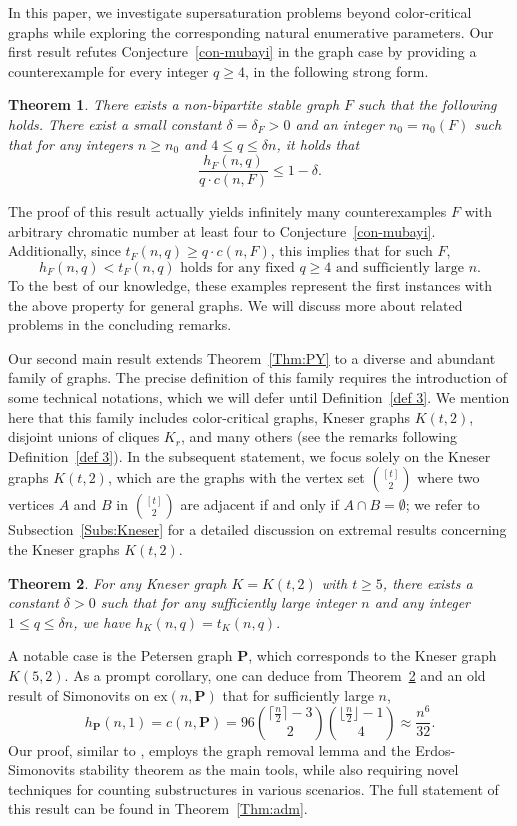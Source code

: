 \documentclass[10pt]{article}
\newtheorem{theorem}{Theorem}[section]
\def\ex{\mathrm{ex}}
\begin{document}
In this paper, we investigate supersaturation problems beyond color-critical graphs while exploring the corresponding natural enumerative parameters.
Our first result refutes Conjecture~\ref{con-mubayi} in the graph case by providing a counterexample for every integer $q\geq 4$, in the following strong form.

\begin{theorem}\label{main-example}
There exists a non-bipartite stable graph $F$ such that the following holds.
There exist a small constant $\delta=\delta_F>0$ and an integer $n_0=n_0(F)$ such that for any integers $n \geq n_0$ and $4 \leq q \leq \delta n$,
it holds that $$\frac{h_F(n,q)}{q \cdot c(n,F)}\leq 1-\delta.$$
\end{theorem}
\noindent The proof of this result actually yields infinitely many counterexamples $F$ with arbitrary chromatic number at least four to Conjecture~\ref{con-mubayi}. Additionally, since $t_F(n,q)\geq q\cdot c(n,F)$, this implies that for such $F$,
$$\mbox{$h_F(n,q)<t_F(n,q)$ holds for any fixed $q\geq 4$ and sufficiently large $n$.}$$
To the best of our knowledge, these examples represent the first instances with the above property for general graphs.
We will discuss more about related problems in the concluding remarks.

Our second main result extends Theorem~\ref{Thm:PY} to a diverse and abundant family of graphs.
The precise definition of this family requires the introduction of some technical notations, which we will defer until Definition~\ref{def 3}.
We mention here that this family includes color-critical graphs, Kneser graphs $K(t,2)$, disjoint unions of cliques $K_r$, and many others (see the remarks following Definition~\ref{def 3}).
In the subsequent statement, we focus solely on the Kneser graphs $K(t,2)$,
which are the graphs with the vertex set $\binom{[t]}{2}$ where two vertices $A$ and $B$ in $\binom{[t]}{2}$ are adjacent if and only if $A\cap B=\emptyset$;
we refer to Subsection~\ref{Subs:Kneser} for a detailed discussion on extremal results concerning the Kneser graphs $K(t,2)$.


\begin{theorem}\label{Thm:Knes}
For any Kneser graph $K=K(t,2)$ with $t\geq 5$, there exists a constant $\delta>0$ such that for any sufficiently large integer $n$ and any integer $1\leq q\leq \delta n$, we have $h_K(n,q)=t_K(n,q).$
\end{theorem}

\noindent A notable case is the Petersen graph $\mathbf{P}$, which corresponds to the Kneser graph $K(5,2)$.
As a prompt corollary, one can deduce from Theorem~\ref{Thm:Knes} and an old result of Simonovits on $\ex(n,\mathbf{P})$ \cite{Simonovits1974} that for sufficiently large $n$,
$$h_{\mathbf{P}}(n,1)=c(n,\mathbf{P})=96{\lceil\frac{n}{2}\rceil-3 \choose 2}{ \lfloor\frac{n}{2}\rfloor-1 \choose 4}\approx \frac{n^6}{32}.$$
Our proof, similar to \cite{mubayi2010,pikhurko2017}, employs the graph removal lemma and the Erdos-Simonovits stability theorem as the main tools, while also requiring novel techniques for counting substructures in various scenarios.
The full statement of this result can be found in Theorem~\ref{Thm:adm}.
\end{document}
